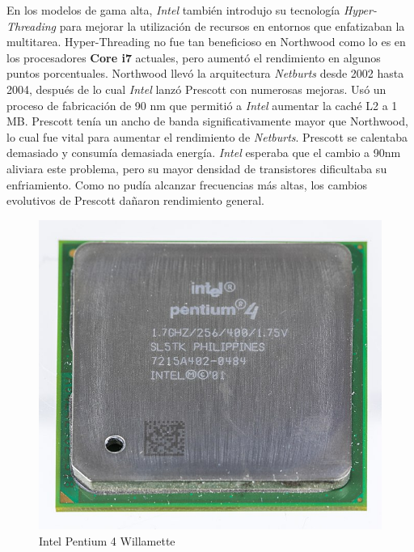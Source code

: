 En los modelos de gama alta, \emph{Intel} también introdujo su tecnología \emph{Hyper-Threading} para mejorar la utilización de recursos en entornos que 
enfatizaban la multitarea. Hyper-Threading no fue tan beneficioso en Northwood como lo es en los procesadores \textbf{Core i7} actuales, pero aumentó el 
rendimiento en algunos puntos porcentuales. Northwood llevó la arquitectura \emph{Netburts} desde 2002 hasta 2004, después de lo cual \emph{Intel} lanzó
Prescott con numerosas mejoras. Usó un proceso de fabricación de 90 nm que permitió a \emph{Intel} aumentar la caché L2 a 1 MB.  Prescott tenía un ancho
de banda significativamente mayor que Northwood, lo cual fue vital para aumentar el rendimiento de \emph{Netburts}. Prescott se calentaba  demasiado y
consumía demasiada energía. \emph{Intel} esperaba que el cambio a 90nm aliviara este problema, pero su mayor densidad de transistores dificultaba su 
enfriamiento. Como no pudía alcanzar frecuencias más altas, los cambios evolutivos de Prescott dañaron rendimiento general.

\begin{figure}[htb]
	\centering
	\includegraphics[scale = 0.15]{Graphics/Pentium_4_-_SL5TK-3056.jpg}
	\caption{Intel Pentium 4 Willamette}
	\label{fig:23}
\end{figure}

